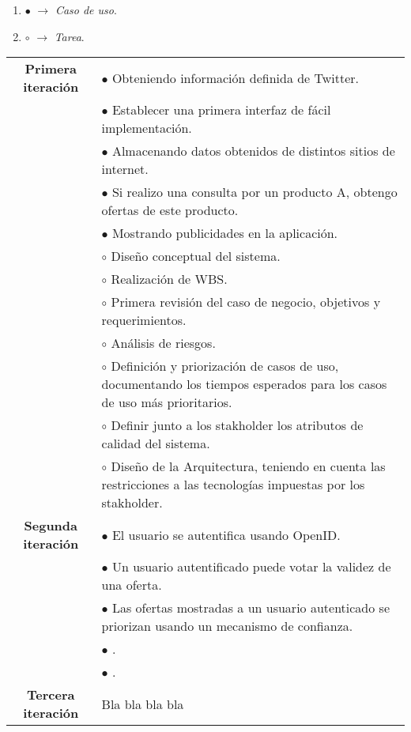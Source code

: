 \begin{enumerate}
	\item $\bullet$ $\rightarrow$ \textit{Caso de uso}.
	\item $\circ$ $\rightarrow$ \textit{Tarea}.
\end{enumerate}

\begin{center}
	\begin{tabular}{| c | p{10cm} |}
		\hline
		\textbf{Primera iteración}& $\bullet$ Obteniendo información definida de Twitter. \\
								  & $\bullet$ Establecer una primera interfaz de fácil implementación. \\
								  & $\bullet$ Almacenando datos obtenidos de distintos sitios de internet. \\
								  & $\bullet$ Si realizo una consulta por un producto A, obtengo ofertas de este producto. \\
								  & $\bullet$ Mostrando publicidades en la aplicación. \\
								  & $\circ$ Diseño conceptual del sistema. \\ 
								  & $\circ$ Realización de WBS. \\
								  & $\circ$ Primera revisión del caso de negocio, objetivos y requerimientos. \\
								  & $\circ$ Análisis de riesgos. \\
								  & $\circ$ Definición y priorización de casos de uso, documentando los tiempos esperados para los casos de uso más prioritarios. \\
								  & $\circ$ Definir junto a los stakholder los atributos de calidad del sistema. \\
								  & $\circ$ Diseño de la Arquitectura, teniendo en cuenta las restricciones a las tecnologías impuestas por los stakholder. \\

		\hline
		\textbf{Segunda iteración}& $\bullet$ El usuario se autentifica usando OpenID. \\
								  & $\bullet$ Un usuario autentificado puede votar la validez de una oferta. \\
								  & $\bullet$ Las ofertas mostradas a un usuario autenticado se priorizan usando un mecanismo de confianza. \\
								  & $\bullet$ . \\
								  & $\bullet$ . \\

		\hline
		\textbf{Tercera iteración}& Bla bla bla bla \\

		\hline
	\end{tabular}
\end{center}
